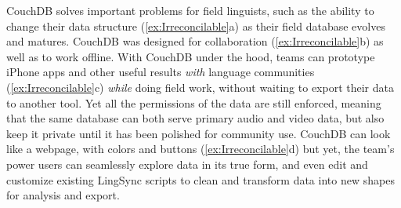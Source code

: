 \documentclass[letterpaper, 12pt, dvips]{mitwpl}
\begin{document}
CouchDB  solves important problems for field linguists, such as the ability to change their  data structure (\ref{ex:Irreconcilable}a) as their field database evolves
and matures. CouchDB was designed for collaboration  (\ref{ex:Irreconcilable}b)
as well as to work offline.
 With CouchDB under the hood, teams can prototype iPhone apps  and other useful results \emph{with} language communities (\ref{ex:Irreconcilable}c) \emph{while} doing field work, without waiting
  to export their data to another tool. Yet all the permissions
 of the data are still enforced, meaning that the same database can both serve primary audio and video \citep{Pfeiffer:2010} data, but also keep it private until it has been polished for community use. CouchDB can look like a webpage, with colors and buttons (\ref{ex:Irreconcilable}d) but yet, the team's power users
 can seamlessly explore data in its true form, and even edit and customize existing LingSync scripts to clean and transform data into new shapes for analysis and export.
\end{document}
